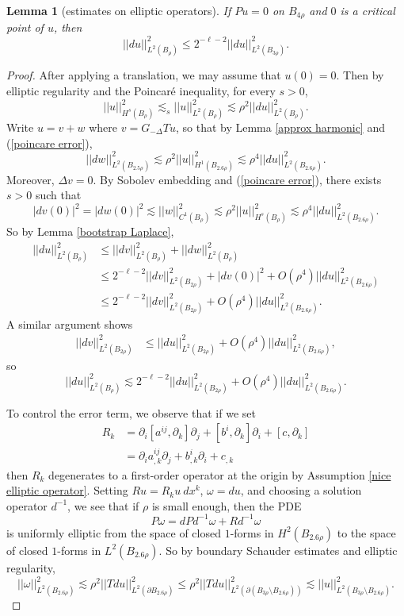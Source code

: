 \documentclass[reqno,12pt,letterpaper]{amsart}
\newtheorem{lemma}[theorem]{Lemma}
\theoremstyle{definition}
\numberwithin{equation}{section}
\begin{document}
\begin{lemma}[estimates on elliptic operators]
If $Pu = 0$ on $B_{4\rho}$ and $0$ is a critical point of $u$, then
$$||du||_{L^2(B_\rho)}^2 \leq 2^{-\ell-2}||du||_{L^2(B_{3\rho})}^2.$$
\end{lemma}
\begin{proof}
After applying a translation, we may assume that $u(0) = 0$.
Then by elliptic regularity and the Poincar\'e inequality, for every $s > 0$,
\begin{equation}\label{poincare error}
||u||_{H^s(B_\rho)}^2 \lesssim_s ||u||_{L^2(B_\rho)}^2 \lesssim \rho^2 ||du||_{L^2(B_\rho)}^2.
\end{equation}
Write $u = v + w$ where $v = G_{-\Delta}Tu$, so that by Lemma \ref{approx harmonic} and (\ref{poincare error}),
$$||dw||_{L^2(B_{2.5\rho})}^2 \lesssim \rho^2 ||u||_{H^1(B_{2.6\rho})}^2 \lesssim \rho^4 ||du||_{L^2(B_{2.6\rho})}^2.$$
Moreover, $\Delta v = 0$.
By Sobolev embedding and (\ref{poincare error}), there exists $s > 0$ such that
$$|dv(0)|^2 = |dw(0)|^2 \lesssim ||w||_{C^1(B_\rho)}^2 \lesssim \rho^2||u||_{H^s(B_\rho)}^2 \lesssim \rho^4||du||_{L^2(B_{2.6\rho})}^2.$$
So by Lemma \ref{bootstrap Laplace},
\begin{align*}
||du||_{L^2(B_\rho)}^2 &\leq ||dv||_{L^2(B_\rho)}^2 + ||dw||_{L^2(B_\rho)}^2 \\
&\leq 2^{-\ell-2} ||dv||_{L^2(B_{2\rho})}^2 + |dv(0)|^2 + O(\rho^4) ||du||_{L^2(B_{2.6\rho})}^2\\
&\leq 2^{-\ell-2} ||dv||_{L^2(B_{2\rho})}^2 + O(\rho^4) ||du||_{L^2(B_{2.6\rho})}^2.
\end{align*}
A similar argument shows
\begin{align*}
||dv||_{L^2(B_{2\rho})}^2 &\leq ||du||_{L^2(B_{2\rho})}^2 + O(\rho^4) ||du||_{L^2(B_{2.6\rho})}^2,
\end{align*}
so
$$||du||_{L^2(B_\rho)}^2 \lesssim 2^{-\ell-2}||du||_{L^2(B_{2\rho})}^2 + O(\rho^4) ||du||_{L^2(B_{2.6\rho})}^2.$$

To control the error term, we observe that if we set
\begin{align*}
R_k &= \partial_i [a^{ij}, \partial_k] \partial_j + [b^i, \partial_k] \partial_i + [c, \partial_k]\\
&= \partial_i a^{ij}_{,k} \partial_j + b^i_{,k} \partial_i + c_{,k}
\end{align*}
then $R_k$ degenerates to a first-order operator at the origin by Assumption \ref{nice elliptic operator}.
Setting $Ru = R_ku ~dx^k$, $\omega = du$, and choosing a solution operator $d^{-1}$, we see that if $\rho$ is small enough, then the PDE
$$P\omega = dPd^{-1}\omega + Rd^{-1}\omega$$
is uniformly elliptic from the space of closed $1$-forms in $H^2(B_{2.6\rho})$ to the space of closed $1$-forms in $L^2(B_{2.6\rho})$.
So by boundary Schauder estimates and elliptic regularity,
$$||\omega||_{L^2(B_{2.6\rho})}^2 \lesssim \rho^2 ||Tdu||_{L^2(\partial B_{2.6\rho})}^2 \leq \rho^2 ||Tdu||_{L^2(\partial(B_{3\rho} \setminus B_{2.6\rho}))}^2 \lesssim ||u||_{L^2(B_{3\rho} \setminus B_{2.6\rho})}^2.$$


\end{proof}
\end{document}
